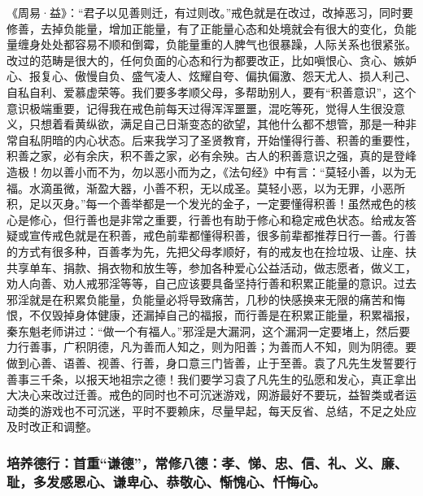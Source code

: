 《周易·益》：“君子以见善则迁，有过则改。”戒色就是在改过，改掉恶习，同时要修善，去掉负能量，增加正能量，有了正能量心态和处境就会有很大的变化，负能量缠身处处都容易不顺和倒霉，负能量重的人脾气也很暴躁，人际关系也很紧张。改过的范畴是很大的，任何负面的心态和行为都要改正，比如嗔恨心、贪心、嫉妒心、报复心、傲慢自负、盛气凌人、炫耀自夸、偏执偏激、怨天尤人、损人利己、自私自利、爱慕虚荣等。我们要多孝顺父母，多帮助别人，要有“积善意识”，这个意识极端重要，记得我在戒色前每天过得浑浑噩噩，混吃等死，觉得人生很没意义，只想着看黄纵欲，满足自己日渐变态的欲望，其他什么都不想管，那是一种非常自私阴暗的内心状态。后来我学习了圣贤教育，开始懂得行善、积善的重要性，积善之家，必有余庆，积不善之家，必有余殃。古人的积善意识之强，真的是登峰造极！勿以善小而不为，勿以恶小而为之，《法句经》中有言：“莫轻小善，以为无福。水滴虽微，渐盈大器，小善不积，无以成圣。莫轻小恶，以为无罪，小恶所积，足以灭身。”每一个善举都是一个发光的金子，一定要懂得积善！虽然戒色的核心是修心，但行善也是非常之重要，行善也有助于修心和稳定戒色状态。给戒友答疑或宣传戒色就是在积善，戒色前辈都懂得积善，很多前辈都推荐日行一善。行善的方式有很多种，百善孝为先，先把父母孝顺好，有的戒友也在捡垃圾、让座、扶共享单车、捐款、捐衣物和放生等，参加各种爱心公益活动，做志愿者，做义工，劝人向善、劝人戒邪淫等等，自己应该要具备坚持行善和积累正能量的意识。过去邪淫就是在积累负能量，负能量必将导致痛苦，几秒的快感换来无限的痛苦和悔恨，不仅毁掉身体健康，还漏掉自己的福报，而行善是在积累正能量，积累福报，秦东魁老师讲过：“做一个有福人。”邪淫是大漏洞，这个漏洞一定要堵上，然后要力行善事，广积阴德，凡为善而人知之，则为阳善；为善而人不知，则为阴德。要做到心善、语善、视善、行善，身口意三门皆善，止于至善。袁了凡先生发誓要行善事三千条，以报天地祖宗之德！我们要学习袁了凡先生的弘愿和发心，真正拿出大决心来改过迁善。戒色的同时也不可沉迷游戏，网游最好不要玩，益智类或者运动类的游戏也不可沉迷，平时不要赖床，尽量早起，每天反省、总结，不足之处应及时改正和调整。

\subsubsection{培养德行：首重“谦德”，常修八德：孝、悌、忠、信、礼、义、廉、耻，多发感恩心、谦卑心、恭敬心、惭愧心、忏悔心。}

